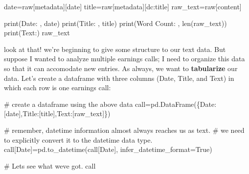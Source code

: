 \documentclass[
  letterpaper,
  DIV=11,
  numbers=noendperiod]{scrreprt}
\newenvironment{Shaded}{\begin{snugshade}}{\end{snugshade}}
\newcommand{\BuiltInTok}[1]{\textcolor[rgb]{0.00,0.23,0.31}{#1}}
\newcommand{\CommentTok}[1]{\textcolor[rgb]{0.37,0.37,0.37}{#1}}
\newcommand{\NormalTok}[1]{\textcolor[rgb]{0.00,0.23,0.31}{#1}}
\newcommand{\OperatorTok}[1]{\textcolor[rgb]{0.37,0.37,0.37}{#1}}
\newcommand{\StringTok}[1]{\textcolor[rgb]{0.13,0.47,0.30}{#1}}
\newcommand{\VariableTok}[1]{\textcolor[rgb]{0.07,0.07,0.07}{#1}}
\begin{document}
\begin{Shaded}
\begin{Highlighting}[]
\NormalTok{date}\OperatorTok{=}\NormalTok{raw[}\StringTok{\textquotesingle{}metadata\textquotesingle{}}\NormalTok{][}\StringTok{\textquotesingle{}date\textquotesingle{}}\NormalTok{]}
\NormalTok{title}\OperatorTok{=}\NormalTok{raw[}\StringTok{\textquotesingle{}metadata\textquotesingle{}}\NormalTok{][}\StringTok{\textquotesingle{}dc:title\textquotesingle{}}\NormalTok{]}
\NormalTok{raw\_text}\OperatorTok{=}\NormalTok{raw[}\StringTok{\textquotesingle{}content\textquotesingle{}}\NormalTok{]}

\BuiltInTok{print}\NormalTok{(}\StringTok{\textquotesingle{}Date: \textquotesingle{}}\NormalTok{, date)}
\BuiltInTok{print}\NormalTok{(}\StringTok{\textquotesingle{}Title: \textquotesingle{}}\NormalTok{, title)}
\BuiltInTok{print}\NormalTok{(}\StringTok{\textquotesingle{}Word Count: \textquotesingle{}}\NormalTok{, }\BuiltInTok{len}\NormalTok{(raw\_text))}
\BuiltInTok{print}\NormalTok{(}\StringTok{\textquotesingle{}Text:\textquotesingle{}}\NormalTok{)}
\NormalTok{raw\_text}
\end{Highlighting}
\end{Shaded}

look at that! we're beginning to give some structure to our text data.
But suppose I wanted to analyze multiple earnings calls; I need to
organize this data so that it can accomodate new entries. As always, we
want to \textbf{tabularize} our data. Let's create a dataframe with
three columns (Date, Title, and Text) in which each row is one earnings
call:

\begin{Shaded}
\begin{Highlighting}[]
\CommentTok{\# create a dataframe using the above data }
\NormalTok{call}\OperatorTok{=}\NormalTok{pd.DataFrame(\{}\StringTok{\textquotesingle{}Date\textquotesingle{}}\NormalTok{:[date],}\StringTok{\textquotesingle{}Title\textquotesingle{}}\NormalTok{:[title],}\StringTok{\textquotesingle{}Text\textquotesingle{}}\NormalTok{:[raw\_text]\})}

\CommentTok{\# remember, datetime information almost always reaches us as text. }
\CommentTok{\# we need to explicitly convert it to the datetime data type. }
\NormalTok{call[}\StringTok{\textquotesingle{}Date\textquotesingle{}}\NormalTok{]}\OperatorTok{=}\NormalTok{pd.to\_datetime(call[}\StringTok{\textquotesingle{}Date\textquotesingle{}}\NormalTok{], infer\_datetime\_format}\OperatorTok{=}\VariableTok{True}\NormalTok{)}

\CommentTok{\# Let\textquotesingle{}s see what we\textquotesingle{}ve got.}
\NormalTok{call}
\end{Highlighting}
\end{Shaded}
\end{document}
